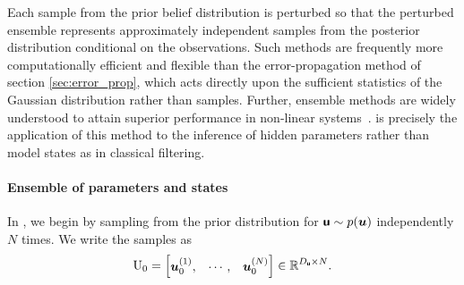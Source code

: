 \documentclass{article}
\theoremstyle{plain}
\theoremstyle{definition}
\theoremstyle{remark}
\begin{document}
Each sample from the prior belief distribution is perturbed so that the perturbed ensemble represents approximately independent samples from the posterior distribution conditional on the observations.
Such methods are frequently more computationally efficient and flexible than the error-propagation method of section \ref{sec:error_prop}, which acts directly upon the sufficient statistics of the Gaussian distribution rather than samples.
Further, ensemble methods are widely understood to attain superior performance in non-linear systems~\citep{FearnheadParticle2018}.
\meth{} is precisely the application of this method to the inference of hidden parameters rather than model states as in classical filtering.

\paragraph{Ensemble of parameters and states}
In  \meth{}, we begin by sampling from the prior distribution for \(\boldsymbol{\mathsf{u}} \sim p(\boldsymbol{u})\) independently $N$ times.
We write the samples as
\begin{align*}
    \mathrm{U}_{0}= \begin{bmatrix}
        \boldsymbol{u}_{0}^{(1)}, & \cdots, & \boldsymbol{u}_{0}^{(N)}
    \end{bmatrix} \in \mathbb{R}^{D_{\boldsymbol{\mathsf{u}}}\times N}.
\end{align*}
\end{document}
